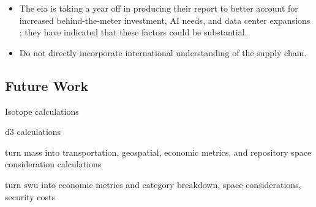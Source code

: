 \begin{itemize}
    \item The \gls{eia} is taking a year off in producing their report to better account for increased behind-the-meter investment, AI needs, and data center expansions \cite{eia_annual_outlook_canceled_2023}; they have indicated that these factors could be substantial.
    \item Do not directly incorporate international understanding of the supply chain.
\end{itemize}


\subsection{Future Work}
\label{sec:future_work}

Isotope calculations

d3 calculations

turn mass into transportation, geospatial, economic metrics, and repository space consideration calculations

turn swu into economic metrics and category breakdown, space considerations, security costs

